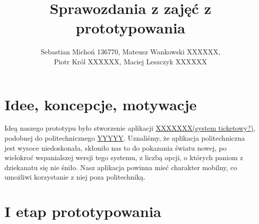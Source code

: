 \documentclass[12pt]{article}
\begin{document}
\title{Sprawozdania z zajęć z prototypowania}
\author{Sebastian Michoń 136770, Mateusz Wankowski XXXXXX,\\ Piotr Król XXXXXX, Maciej Leszczyk XXXXXX}
\date{\vspace{-3ex}}
\maketitle

\section{Idee, koncepcje, motywacje}
Ideą naszego prototypu było stworzenie aplikacji \underline{XXXXXXX(system ticketowy?)}, podobnej do politechnicznego \underline{YYYYY}. Uznaliśmy, że aplikacja politechniczna jest wysoce niedoskonała, skłoniło nas to do pokazania światu nowej, po wielokroć wspanialszej wersji tego systemu, z liczbą opcji, o których paniom z dziekanatu się nie śniło. Nasz aplikacja powinna mieć charakter mobilny, co umożliwi korzystanie z niej poza politechniką.

\section{I etap prototypowania}
\end{document}
